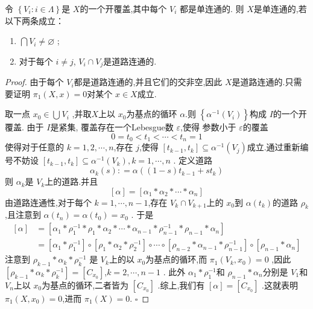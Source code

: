 \documentclass[../../几何与拓扑.tex]{subfiles}
\begin{document}
\begin{theorem}
    令 \(  \left\{ V_{i}: i \in  \Lambda  \right\}  \)是 \(  X  \)的一个开覆盖,其中每个 \(  V_{i}  \)   都是单连通的.
    则 \(  X  \)是单连通的,若以下两条成立：
    \begin{enumerate}
        \item \(  \bigcap V_{i} \neq \varnothing   \) ;
        \item 对于每个 \(  i \neq j  \), \(  V_{i}\cap V_{j}  \)是道路连通的.  
    \end{enumerate}
     
\end{theorem}
\begin{proof}

    由于每个 \(  V_{i}  \)都是道路连通的,并且它们的交非空,因此 \(  X  \)是道路连通的.只需要证明 \(  \pi _1 \left( X,x \right)= 0   \)对某个 \(  x \in X  \)成立.    

    取一点 \(  x_0 \in \bigcup_{}V_{i}   \) ,并取\(  X  \)上以 \(  x_0  \)为基点的循环 \(  \alpha   \).则 \(  \left\{ \alpha ^{-1} \left( V_{i} \right)  \right\}  \)构成 \(  I  \)的一个开覆盖.
    由于 \(  I  \)是紧集, 覆盖存在一个Lebesgue数 \(  \varepsilon   \),使得 参数小于 \(  \varepsilon   \)的覆盖 \[
    0 =  t_0 < t_1< \cdots < t_{n}=  1
    \] 使得对于任意的 \(  k  = 1,2,\cdots ,n\),存在 \(  j  \),使得   \(  [t_{k-1},t_{k}]\subseteq \alpha ^{-1} \left( V_{j} \right)   \)成立.通过重新编号不妨设 \(  [t_{k-1},t_{k}]  \subseteq  \alpha ^{-1} \left( V_{k} \right), k=  1,\cdots,n  \) .
    定义道路 \[
    \alpha _{k}\left( s \right): =  \alpha \left( \left( 1-s \right)t_{k-1}+ st_{k}  \right)  
    \]则 \(  \alpha _{k}  \)是 \(  V_{k}  \)上的道路.并且 \[
    [\alpha ] =  [\alpha _1 *\alpha _2 * \cdots * \alpha _n ]
    \]  由道路连通性,对于每个 \(  k= 1,\cdots,n -1  \),存在 \(  V_{k} \cap V_{k+ 1} \)上的 \(  x_0  \)到 \(  \alpha \left( t_{k} \right)   \)的道路 \(  \rho _{k}  \),且注意到 \(  \alpha \left( t_{n} \right) =  \alpha \left( t_0 \right)= x_0    \) .     
    于是 \[
    \begin{aligned}
    [\alpha ]& =  [\alpha _1 * \rho _1 ^{-1} *\rho _1 *\alpha _2 * \cdots* \alpha _{n-1} * \rho_{n-1}^{-1} *\rho _{n-1}* \alpha _{n}]\\ 
     & =  [\alpha _1 * \rho_1 ^{-1} ]\circ [\rho _1 *\alpha _2 * \rho _{2}^{-1} ]\circ \cdots \circ [\rho _{n-2}*\alpha _{n-1}*\rho _{n-1}^{-1} ]\circ [\rho_{n-1}*\alpha _{n}] 
    \end{aligned}
    \]注意到 \(  \rho _{k-1}* \alpha _{k}* \rho _{k}^{-1}   \) 是 \(  V_{k}  \)上的以 \(  x_0  \)为基点的循环,而 \(  \pi _1 \left( V_{k},x_0 \right)= 0   \)  ,因此 \(  [\rho _{k-1}* \alpha _{k}* \rho _{k}^{-1} ] =  [C_{x_0}]  \),\(  k= 2,\cdots ,n-1  \) .  
    此外 \(  \alpha _1 *\rho _{1}^{-1}   \)和 \(  \rho _{n-1} * \alpha _n   \)分别是 \(  V_1  \)和 \(  V_{n}  \)上以 \(  x_0  \)为基点的循环,二者皆为 \(  [C_{x_0}]  \)      .综上,我们有 \(  [\alpha ]= [C_{x_0}]  \) .这就表明 \(  \pi _1 \left( X,x_0 \right)= 0   \),进而 \(  \pi _1 \left( X \right)= 0   \).  
    \hfill $\square$
\end{proof}
\end{document}
